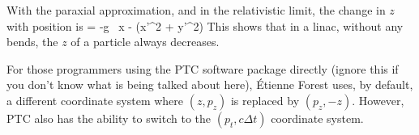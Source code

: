 With the paraxial approximation, and in the relativistic limit, the
change in $z$ with position is
\Begineq
   = -g \, x -  (x'^2 + y'^2)
\Endeq
This shows that in a linac, without any bends, the $z$ of a particle
always decreases.

For those programmers using the PTC
software package directly (ignore
this if you don't know what is being talked about here), \'Etienne Forest uses,
by default, a different coordinate system where $(z, p_z)$ is replaced
by $(p_z, -z)$. However, PTC also has the ability to switch to the
$(p_t, c \Delta t)$ coordinate system.

